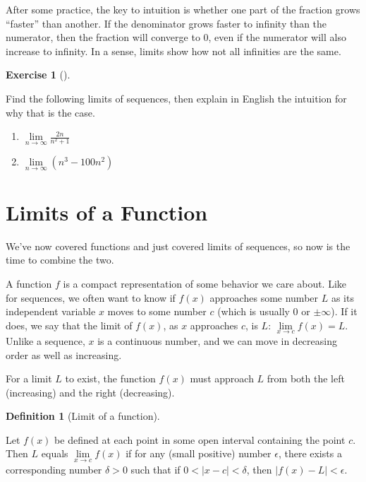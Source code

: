 \documentclass[
  letterpaper,
]{book}
\providecommand{\tightlist}{%
  \setlength{\itemsep}{0pt}\setlength{\parskip}{0pt}}\usepackage{longtable,booktabs,array}
\theoremstyle{definition}
\newtheorem{definition}{Definition}[chapter]
\theoremstyle{definition}
\theoremstyle{plain}
\theoremstyle{definition}
\newtheorem{exercise}{Exercise}[chapter]
\theoremstyle{plain}
\theoremstyle{plain}
\theoremstyle{remark}
\begin{document}
After some practice, the key to intuition is whether one part of the
fraction grows ``faster'' than another. If the denominator grows faster
to infinity than the numerator, then the fraction will converge to 0,
even if the numerator will also increase to infinity. In a sense, limits
show how not all infinities are the same.

\leavevmode{}%
\begin{exercise}[]\label{exr-limseq2}

Find the following limits of sequences, then explain in English the
intuition for why that is the case.

\begin{enumerate}
\def\labelenumi{\arabic{enumi}.}
\tightlist
\item
  \(\lim\limits_{n\to\infty} \frac{2n}{n^2 + 1}\)
\item
  \(\lim\limits_{n\to\infty} (n^3 - 100n^2)\)
\end{enumerate}

\end{exercise}

\hypertarget{limitsfun}{%
\section{Limits of a Function}\label{limitsfun}}

We've now covered functions and just covered limits of sequences, so now
is the time to combine the two.

A function \(f\) is a compact representation of some behavior we care
about. Like for sequences, we often want to know if \(f(x)\) approaches
some number \(L\) as its independent variable \(x\) moves to some number
\(c\) (which is usually 0 or \(\pm\infty\)). If it does, we say that the
limit of \(f(x)\), as \(x\) approaches \(c\), is \(L\):
\(\lim\limits_{x \to c} f(x)=L\). Unlike a sequence, \(x\) is a
continuous number, and we can move in decreasing order as well as
increasing.

For a limit \(L\) to exist, the function \(f(x)\) must approach \(L\)
from both the left (increasing) and the right (decreasing).

\leavevmode{}%
\begin{definition}[Limit of a function]\label{def-limfun}

Let \(f(x)\) be defined at each point in some open interval containing
the point \(c\). Then \(L\) equals \(\lim\limits_{x \to c} f(x)\) if for
any (small positive) number \(\epsilon\), there exists a corresponding
number \(\delta>0\) such that if \(0<|x-c|<\delta\), then
\(|f(x)-L|<\epsilon\).

\end{definition}
\end{document}
